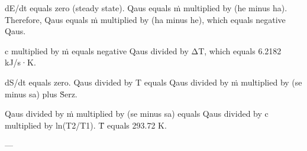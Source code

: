 dE/dt equals zero (steady state).  
Qaus equals ṁ multiplied by (he minus ha). Therefore, Qaus equals ṁ multiplied by (ha minus he), which equals negative Qaus.  

c multiplied by ṁ equals negative Qaus divided by ΔT, which equals 6.2182 kJ/s·K.  

dS/dt equals zero.  
Qaus divided by T equals Qaus divided by ṁ multiplied by (se minus sa) plus Ṡerz.  

Qaus divided by ṁ multiplied by (se minus sa) equals Qaus divided by c multiplied by ln(T2/T1).  
T̄ equals 293.72 K.  

---